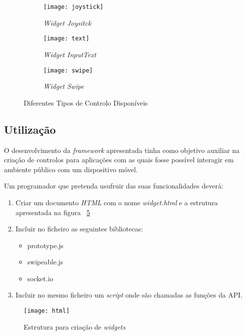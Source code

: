 	\begin{figure}[ht]
	  \centering
	  \leavevmode
	  \begin{subfigure}{.33\textwidth}
	    \centering
	    \texttt{[image: joystick]}
	    \caption{\textit{Widget Joysitck}}
	    \label{fig:joystick}
	  \end{subfigure}%
	  \begin{subfigure}{.33\textwidth}
	    \centering
	    \texttt{[image: text]}
	    \caption{\textit{Widget InputText}}
	    \label{fig:inputext}
	  \end{subfigure}%
	   \begin{subfigure}{.33\textwidth}
	    \centering
	    \texttt{[image: swipe]}
	    \caption{\textit{Widget Swipe}}
	    \label{fig:swipe}
	  \end{subfigure}
	  \caption{Diferentes Tipos de Controlo Disponíveis}
	  \label{fig:widgets}
	\end{figure}

\pagebreak

\subsection{Utilização}

	O desenvolvimento da \textit{framework} apresentada tinha como objetivo auxiliar na criação de controlos para aplicações com as quais fosse possível interagir em ambiente público com um dispositivo móvel.

	Um programador que pretenda usufruir das suas funcionalidades deverá:

	\begin{enumerate}
		\item Criar um documento \textit{HTML} com o nome \textit{widget.html} e a estrutura apresentada na figura ~\ref{fig:html_struct}
		\item Incluir no ficheiro as seguintes bibliotecas:
			\begin{itemize}
			\item prototype.js 
			\item swipeable.js
			\item socket.io
			\end{itemize}
		\item Incluir no mesmo ficheiro um \textit{script}
		 onde são chamadas as funções da API.
	\end{enumerate}

	\begin{figure}[ht]
		\centering
		\texttt{[image: html]}
		\caption[Estrutura \textit{HTML}] {Estrutura para criação de \textit{widgets}}
		\label{fig:html_struct}
	\end{figure}

